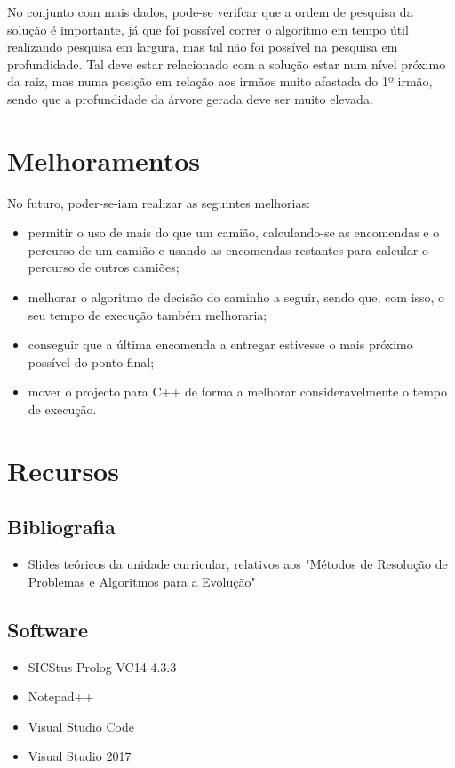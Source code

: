 \documentclass[a4paper]{article}
\begin{document}
No conjunto com mais dados, pode-se verifcar que a ordem de pesquisa da solução é importante, já que foi possível correr o algoritmo em tempo útil realizando pesquisa em largura, mas tal não foi possível na pesquisa em profundidade. Tal deve estar relacionado com a solução estar num nível próximo da raiz, mas numa posição em relação aos irmãos muito afastada do 1º irmão, sendo que a profundidade da árvore gerada deve ser muito elevada.

\newpage

\section{Melhoramentos}

No futuro, poder-se-iam realizar as seguintes melhorias:
\begin{itemize}
	\item permitir o uso de mais do que um camião, calculando-se as encomendas e o percurso de um camião e usando as encomendas restantes para calcular o percurso de outros camiões;
	\item melhorar o algoritmo de decisão do caminho a seguir, sendo que, com isso, o seu tempo de execução também melhoraria;
	\item conseguir que a última encomenda a entregar estivesse o mais próximo possível do ponto final;
	\item mover o projecto para C++ de forma a melhorar consideravelmente o tempo de execução.
\end{itemize}

\newpage

\section{Recursos}

\subsection{Bibliografia}
\begin{itemize}
	\item Slides teóricos da unidade curricular, relativos aos "Métodos de Resolução de Problemas e Algoritmos para a Evolução"
\end{itemize}

\subsection{Software}
\begin{itemize}
	\item SICStus Prolog VC14 4.3.3
	\item Notepad++
	\item Visual Studio Code
	\item Visual Studio 2017
\end{itemize}
\end{document}
